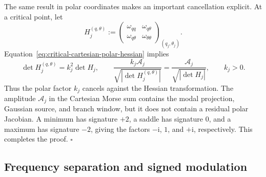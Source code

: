 The same result in polar coordinates makes an important cancellation
explicit.  At a critical point, let
\begin{equation}
  H_j^{(q,\theta)}
  :=\begin{pmatrix}
      \omega_{qq}&\omega_{q\theta}\\
      \omega_{q\theta}&\omega_{\theta\theta}
    \end{pmatrix}_{(q_j,\theta_j)}.
  \label{eq:polar-coordinate-phase-hessian}
\end{equation}
Equation~\eqref{eq:critical-cartesian-polar-hessian} implies
\begin{equation}
  \det H_j^{(q,\theta)}
  =k_j^2\det H_j,
  \qquad
  \frac{k_j\mathcal A_j}
       {\sqrt{|\det H_j^{(q,\theta)}|}}
  =\frac{\mathcal A_j}{\sqrt{|\det H_j|}},
  \qquad k_j>0.
  \label{eq:polar-jacobian-cancellation}
\end{equation}
Thus the polar factor \(k_j\) cancels against the Hessian transformation.
The amplitude \(\mathcal A_j\) in the Cartesian Morse sum contains the
modal projection, Gaussian source, and branch window, but it does not
contain a residual polar Jacobian.  A minimum has signature \(+2\), a saddle
has signature \(0\), and a maximum has signature \(-2\), giving the factors
\(-\mathrm i\), \(1\), and \(+\mathrm i\), respectively.  This completes
the proof. \(\square\)

\subsection{Frequency separation and signed modulation}

